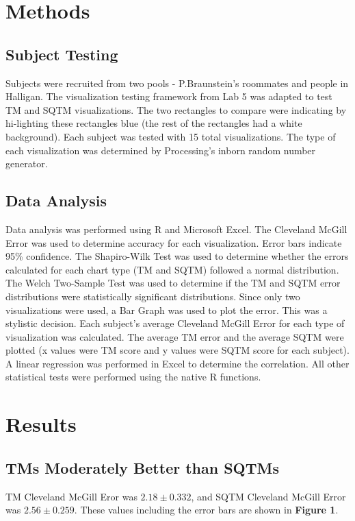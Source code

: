 \documentclass{article}
\begin{document}
\section*{Methods}
\subsection*{Subject Testing}
Subjects were recruited from two pools - P.Braunstein's roommates and people in Halligan. The visualization testing
framework from Lab 5 was adapted to test TM and SQTM visualizations. The two rectangles to compare were indicating
by hi-lighting these rectangles blue (the rest of the rectangles had a white background). Each subject was tested with 15 total visualizations. The type of each visualization was determined by Processing's inborn random number generator.  

\subsection*{Data Analysis}
Data analysis was performed using R and Microsoft Excel. The Cleveland McGill Error was used to determine accuracy for each visualization. Error bars indicate 95\% confidence. The Shapiro-Wilk Test was used to determine whether the errors calculated for each chart type (TM and SQTM)
followed a normal distribution. The Welch Two-Sample Test was used to determine if the TM and SQTM error distributions
were statistically significant distributions. Since only two visualizations were used, a Bar Graph was used to plot the error. This was a stylistic decision. Each subject's average Cleveland McGill Error for each type of visualization was calculated. The average TM error and the average SQTM were plotted (x values were TM score and y values were SQTM score for each subject). A linear regression was performed in Excel to determine the correlation. All other statistical tests were performed using the native R functions.

\section*{Results}
\subsection*{TMs Moderately Better than SQTMs}
TM Cleveland McGill Eror was $2.18 \pm 0.332$, and SQTM Cleveland McGill Error was $2.56 \pm 0.259$. These values including
the error bars are shown in \textbf{Figure 1}.
\end{document}
